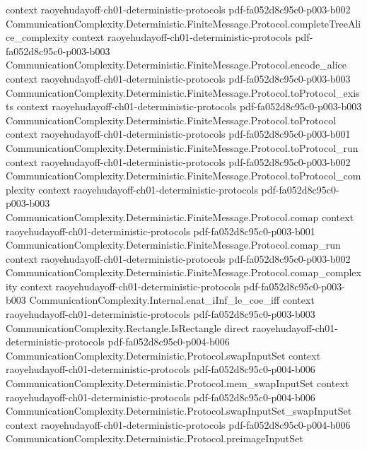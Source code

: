 \begin{theorem}
  {context}
  {raoyehudayoff-ch01-deterministic-protocols}
  {pdf-fa052d8c95c0-p003-b002}
\proofstep
  {CommunicationComplexity.Deterministic.FiniteMessage.Protocol.completeTreeAlice_complexity}
  {context}
  {raoyehudayoff-ch01-deterministic-protocols}
  {pdf-fa052d8c95c0-p003-b003}
\proofstep
  {CommunicationComplexity.Deterministic.FiniteMessage.Protocol.encode_alice}
  {context}
  {raoyehudayoff-ch01-deterministic-protocols}
  {pdf-fa052d8c95c0-p003-b003}
\proofstep
  {CommunicationComplexity.Deterministic.FiniteMessage.Protocol.toProtocol_exists}
  {context}
  {raoyehudayoff-ch01-deterministic-protocols}
  {pdf-fa052d8c95c0-p003-b003}
\proofstep
  {CommunicationComplexity.Deterministic.FiniteMessage.Protocol.toProtocol}
  {context}
  {raoyehudayoff-ch01-deterministic-protocols}
  {pdf-fa052d8c95c0-p003-b001}
\proofstep
  {CommunicationComplexity.Deterministic.FiniteMessage.Protocol.toProtocol_run}
  {context}
  {raoyehudayoff-ch01-deterministic-protocols}
  {pdf-fa052d8c95c0-p003-b002}
\proofstep
  {CommunicationComplexity.Deterministic.FiniteMessage.Protocol.toProtocol_complexity}
  {context}
  {raoyehudayoff-ch01-deterministic-protocols}
  {pdf-fa052d8c95c0-p003-b003}
\proofstep
  {CommunicationComplexity.Deterministic.FiniteMessage.Protocol.comap}
  {context}
  {raoyehudayoff-ch01-deterministic-protocols}
  {pdf-fa052d8c95c0-p003-b001}
\proofstep
  {CommunicationComplexity.Deterministic.FiniteMessage.Protocol.comap_run}
  {context}
  {raoyehudayoff-ch01-deterministic-protocols}
  {pdf-fa052d8c95c0-p003-b002}
\proofstep
  {CommunicationComplexity.Deterministic.FiniteMessage.Protocol.comap_complexity}
  {context}
  {raoyehudayoff-ch01-deterministic-protocols}
  {pdf-fa052d8c95c0-p003-b003}
\proofstep
  {CommunicationComplexity.Internal.enat_iInf_le_coe_iff}
  {context}
  {raoyehudayoff-ch01-deterministic-protocols}
  {pdf-fa052d8c95c0-p003-b003}
\proofstep
  {CommunicationComplexity.Rectangle.IsRectangle}
  {direct}
  {raoyehudayoff-ch01-deterministic-protocols}
  {pdf-fa052d8c95c0-p004-b006}
\proofstep
  {CommunicationComplexity.Deterministic.Protocol.swapInputSet}
  {context}
  {raoyehudayoff-ch01-deterministic-protocols}
  {pdf-fa052d8c95c0-p004-b006}
\proofstep
  {CommunicationComplexity.Deterministic.Protocol.mem_swapInputSet}
  {context}
  {raoyehudayoff-ch01-deterministic-protocols}
  {pdf-fa052d8c95c0-p004-b006}
\proofstep
  {CommunicationComplexity.Deterministic.Protocol.swapInputSet_swapInputSet}
  {context}
  {raoyehudayoff-ch01-deterministic-protocols}
  {pdf-fa052d8c95c0-p004-b006}
\proofstep
  {CommunicationComplexity.Deterministic.Protocol.preimageInputSet}

\end{theorem}
